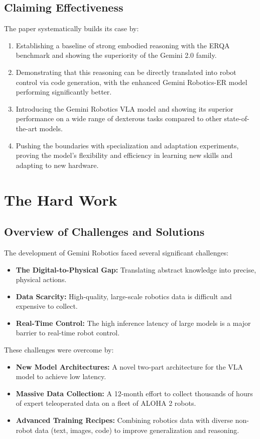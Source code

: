 \documentclass{article}
\begin{document}
\subsection{Claiming Effectiveness}
The paper systematically builds its case by:
\begin{enumerate}
    \item Establishing a baseline of strong embodied reasoning with the ERQA benchmark and showing the superiority of the Gemini 2.0 family.
    \item Demonstrating that this reasoning can be directly translated into robot control via code generation, with the enhanced Gemini Robotics-ER model performing significantly better.
    \item Introducing the Gemini Robotics VLA model and showing its superior performance on a wide range of dexterous tasks compared to other state-of-the-art models.
    \item Pushing the boundaries with specialization and adaptation experiments, proving the model's flexibility and efficiency in learning new skills and adapting to new hardware.
\end{enumerate}

\section{The Hard Work}

\subsection{Overview of Challenges and Solutions}
The development of Gemini Robotics faced several significant challenges:
\begin{itemize}
    \item \textbf{The Digital-to-Physical Gap:} Translating abstract knowledge into precise, physical actions.
    \item \textbf{Data Scarcity:} High-quality, large-scale robotics data is difficult and expensive to collect.
    \item \textbf{Real-Time Control:} The high inference latency of large models is a major barrier to real-time robot control.
\end{itemize}

These challenges were overcome by:
\begin{itemize}
    \item \textbf{New Model Architectures:} A novel two-part architecture for the VLA model to achieve low latency.
    \item \textbf{Massive Data Collection:} A 12-month effort to collect thousands of hours of expert teleoperated data on a fleet of ALOHA 2 robots.
    \item \textbf{Advanced Training Recipes:} Combining robotics data with diverse non-robot data (text, images, code) to improve generalization and reasoning.
\end{itemize}
\end{document}
